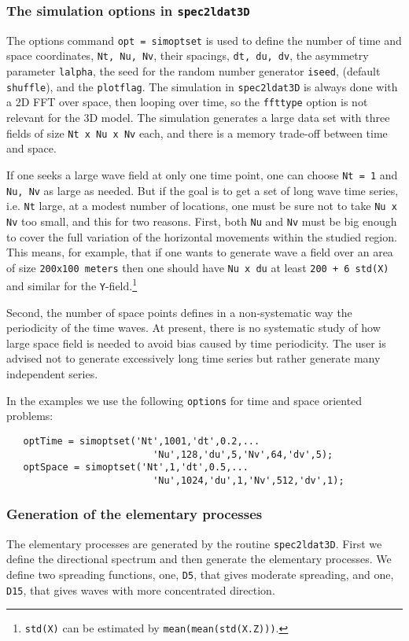 \subsubsection*{The simulation options in {\tt spec2ldat3D}}
The options command {\tt opt = simoptset} is used to define the number of time and space coordinates, {\tt Nt, Nu, Nv},  their spacings, {\tt dt, du, dv}, the asymmetry parameter {\tt lalpha}, the seed for the random number generator {\tt iseed}, (default {\tt shuffle}), and the {\tt plotflag}. The simulation in 
{\tt spec2ldat3D} is always done with a 2D FFT over space, 
then looping over time, so the {\tt ffttype} option is not relevant 
for the 3D model.
The simulation generates a large data set with three fields 
of size {\tt Nt x Nu x Nv} each, and there is a memory trade-off 
between time and space.

If one seeks a large wave field at only one time point, one can choose 
{\tt Nt = 1} and {\tt Nu, Nv} as large as needed.  But if the goal is to get 
a set of long wave time series, i.e. {\tt Nt} large, at a modest number 
of locations, one must be sure not to take {\tt Nu x Nv} too small, 
and this for two reasons. First, both {\tt Nu} and {\tt Nv} must be 
big enough to cover the full variation of the horizontal movements 
within the studied region. This means, for example, that if one 
wants to generate wave a field over an area of size {\tt 200x100 meters} 
then one should have {\tt Nu x du} at least\label{opt}
{\tt 200 + 6 std(X)} and similar for  the 
{\tt Y}-field.\footnote{{\tt std(X)} can be estimated by
{\tt mean(mean(std(X.Z)))}.}

Second, the number of space points defines in a non-systematic way the periodicity of the time waves. At present, there is no systematic study of how large space field is needed to avoid bias caused by time periodicity. The user is advised not to generate excessively long time series but rather generate many independent series. 

In the examples we use the following {\tt options} for time and space oriented problems:
{\small\begin{verbatim}
   optTime = simoptset('Nt',1001,'dt',0.2,...
                          'Nu',128,'du',5,'Nv',64,'dv',5);
   optSpace = simoptset('Nt',1,'dt',0.5,...
                          'Nu',1024,'du',1,'Nv',512,'dv',1);
\end{verbatim}
}

\subsubsection*{Generation of the elementary processes}
The elementary processes are generated by the routine {\tt spec2ldat3D}.
First we define the directional spectrum and then generate the elementary processes.
We define two spreading functions, one, {\tt D5}, that gives moderate spreading,
and one, {\tt D15}, that gives waves with more concentrated direction.

